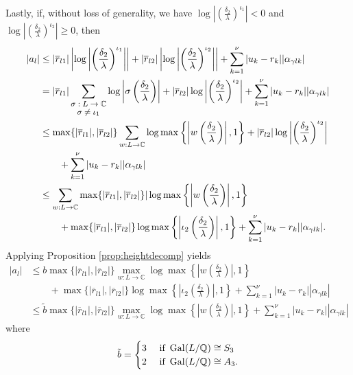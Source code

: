 Lastly, if, without loss of generality, we have $\log\left|\left(\frac{\delta_2}{\lambda}\right)^{\iota_1}\right| < 0$ and $\log\left|\left(\frac{\delta_2}{\lambda}\right)^{\iota_2}\right| \geq 0$, then
\begin{align*}
|a_l| 	& \leq |\overline{r}_{l1}|\left|\log\left|\left(\frac{\delta_2}{\lambda}\right)^{\iota_1}\right|\right| + |\overline{r}_{l2}|\left|\log\left|\left(\frac{\delta_2}{\lambda}\right)^{\iota_2}\right|\right| + \sum_{k=1}^{\nu}|u_k-r_k||\alpha_{\gamma l k}|\\
	& = |\overline{r}_{l1}|\sum_{\shortstack{\footnotesize $\sigma: L \to \mathbb{C} $\\ \footnotesize $ \sigma \neq \iota_1$}} \log\left|\sigma \left(\frac{\delta_2}{\lambda}\right)\right|+ |\overline{r}_{l2}|\log\left|\left(\frac{\delta_2}{\lambda}\right)^{\iota_2}\right| + \sum_{k=1}^{\nu}|u_k-r_k||\alpha_{\gamma l k}|\\
	& \leq \max\{|\overline{r}_{l1}|, |\overline{r}_{l2}|\}\sum_{w: L \to \mathbb{C}} \log \max \left\{\left|w\left(\frac{\delta_2}{\lambda}\right)\right|, 1\right\} +  |\overline{r}_{l2}|\log\left|\left(\frac{\delta_2}{\lambda}\right)^{\iota_2}\right| \\
	&\quad \quad +\sum_{k=1}^{\nu}|u_k-r_k||\alpha_{\gamma l k}| \\
	& \leq \sum_{w: L \to \mathbb{C}}\max\{|\overline{r}_{l1}|, |\overline{r}_{l2}|\}|\log\max\left\{\left|w\left(\frac{\delta_2}{\lambda}\right)\right|,1\right\}  \\
	& \quad\quad + \max\{|\overline{r}_{l1}|, |\overline{r}_{l2}|\}\log\max\left\{\left|\iota_2\left(\frac{\delta_2}{\lambda}\right)\right|,1\right\} + \sum_{k=1}^{\nu}|u_k-r_k||\alpha_{\gamma l k}|.
\end{align*}
Applying Proposition \ref{prop:heightdecomp} yields
\begin{align*}
|a_l| & \leq b\max\{|\overline{r}_{l1}|, |\overline{r}_{l2}|\}\max_{w:L\to \mathbb{C}} \log \max \left\{ \left|w\left(\frac{\delta_2}{\lambda}\right)\right|, 1\right\}\\
	& \quad \quad + \max\{|\overline{r}_{l1}|, |\overline{r}_{l2}|\}\log\max\left\{\left|\iota_2\left(\frac{\delta_2}{\lambda}\right)\right|,1\right\} + \sum_{k=1}^{\nu}|u_k-r_k||\alpha_{\gamma l k}| \\
	& \leq \tilde{b} \max\{|\overline{r}_{l1}|, |\overline{r}_{l2}|\}\max_{w:L\to \mathbb{C}} \log \max \left\{ \left|w\left(\frac{\delta_2}{\lambda}\right)\right|, 1\right\} + \sum_{k=1}^{\nu}|u_k-r_k||\alpha_{\gamma l k}|
\end{align*}
where
\[\tilde{b} =
\begin{cases}
3 & \text{ if } \operatorname{Gal}(L/\mathbb{Q}) \cong S_3\\
2 & \text{ if } \operatorname{Gal}(L/\mathbb{Q}) \cong A_3.
\end{cases}\]

